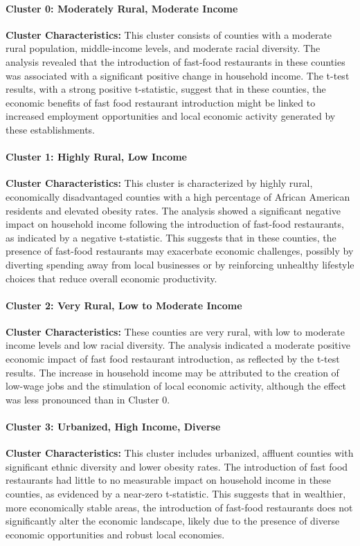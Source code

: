 \documentclass[letterpaper, 11pt]{report}
\begin{document}
\paragraph{Cluster 0: Moderately Rural, Moderate Income}
\textbf{Cluster Characteristics:} This cluster consists of counties with a moderate rural population, middle-income levels, and moderate racial diversity. The analysis revealed that the introduction of fast-food restaurants in these counties was associated with a significant positive change in household income. The t-test results, with a strong positive t-statistic, suggest that in these counties, the economic benefits of fast food restaurant introduction might be linked to increased employment opportunities and local economic activity generated by these establishments.

\paragraph{Cluster 1: Highly Rural, Low Income}
\textbf{Cluster Characteristics:} This cluster is characterized by highly rural, economically disadvantaged counties with a high percentage of African American residents and elevated obesity rates. The analysis showed a significant negative impact on household income following the introduction of fast-food restaurants, as indicated by a negative t-statistic. This suggests that in these counties, the presence of fast-food restaurants may exacerbate economic challenges, possibly by diverting spending away from local businesses or by reinforcing unhealthy lifestyle choices that reduce overall economic productivity.

\paragraph{Cluster 2: Very Rural, Low to Moderate Income}
\textbf{Cluster Characteristics:} These counties are very rural, with low to moderate income levels and low racial diversity. The analysis indicated a moderate positive economic impact of fast food restaurant introduction, as reflected by the t-test results. The increase in household income may be attributed to the creation of low-wage jobs and the stimulation of local economic activity, although the effect was less pronounced than in Cluster 0.

\paragraph{Cluster 3: Urbanized, High Income, Diverse}
\textbf{Cluster Characteristics:} This cluster includes urbanized, affluent counties with significant ethnic diversity and lower obesity rates. The introduction of fast food restaurants had little to no measurable impact on household income in these counties, as evidenced by a near-zero t-statistic. This suggests that in wealthier, more economically stable areas, the introduction of fast-food restaurants does not significantly alter the economic landscape, likely due to the presence of diverse economic opportunities and robust local economies.
\end{document}
